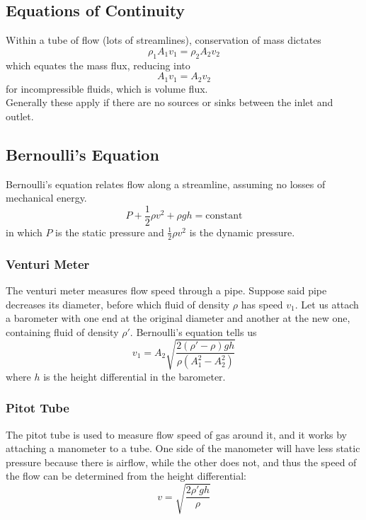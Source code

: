 \documentclass[../PhysicsFormulae.tex]{subfiles}
\begin{document}
\subsection{Equations of Continuity}
Within a tube of flow (lots of streamlines), conservation of mass dictates
\[ \rho_1 A_1 v_1 = \rho_2 A_2 v_2 \]
which equates the mass flux, reducing into
\[ A_1 v_1 = A_2 v_2 \]
for incompressible fluids, which is volume flux. \\
Generally these apply if there are no sources or sinks between the inlet and outlet. 

\subsection{Bernoulli's Equation}
Bernoulli's equation relates flow along a streamline, assuming no losses of mechanical energy.
\[ P + \frac{1}{2}\rho v^2 + \rho g h = \textrm{constant} \]
in which $P$ is the static pressure and $\frac{1}{2}\rho v^2$ is the dynamic pressure. 

\subsubsection{Venturi Meter}
The venturi meter measures flow speed through a pipe. Suppose said pipe decreases its diameter, before which fluid of density $\rho$ has speed $v_1$. Let us attach a barometer with one end at the original diameter and another at the new one, containing fluid of density $\rho'$. Bernoulli's equation tells us
\[ v_1 = A_2 \sqrt{\frac{2(\rho ' - \rho)gh}{\rho (A_1^2 - A_2^2)}} \]
where $h$ is the height differential in the barometer.

\subsubsection{Pitot Tube}
The pitot tube is used to measure flow speed of gas around it, and it works by attaching a manometer to a tube. One side of the manometer will have less static pressure because there is airflow, while the other does not, and thus the speed of the flow can be determined from the height differential:
\[ v = \sqrt{\frac{2\rho'gh}{\rho}} \]
\end{document}

